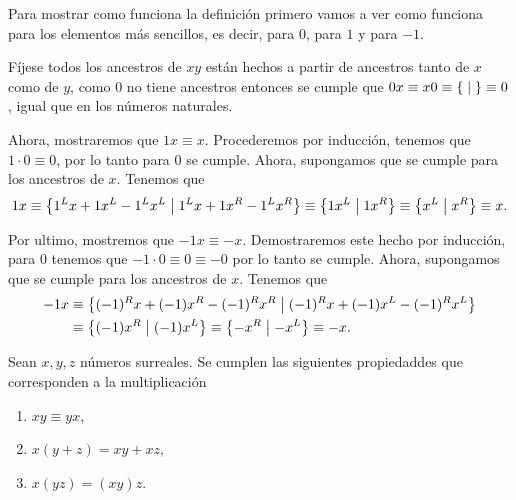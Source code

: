     \begin{example}
        Para mostrar como funciona la definici\'on primero vamos a ver como funciona para los elementos m\'as sencillos, es decir, para $0$, para $1$ y para $-1$.

        F\'ijese todos los ancestros de $xy$ est\'an hechos a partir de ancestros tanto de $x$ como de $y$, como $0$ no tiene ancestros entonces se cumple que $0x \equiv x0 \equiv \left\{\;\middle|\; \right\} \equiv 0$, igual que en los n\'umeros naturales.
        
        Ahora, mostraremos que $1x \equiv x$. Procederemos por inducci\'on, tenemos que $1\cdot 0 \equiv 0$, por lo tanto para $0$ se cumple. Ahora, supongamos que se cumple para los ancestros de $x$. Tenemos que 
        \[
            1x \equiv \left\{1^Lx + 1x^L - 1^Lx^L\;\middle|\; 1^Lx + 1x^R - 1^Lx^R\right\} \equiv \left\{1x^L\;\middle|\; 1x^R\right\} \equiv \left\{x^L\;\middle|\; x^R\right\} \equiv x.
        \]

        Por ultimo, mostremos que $-1x \equiv -x$. Demostraremos este hecho por inducci\'on, para $0$ tenemos que $-1\cdot 0\equiv 0 \equiv -0$ por lo tanto se cumple. Ahora, supongamos que se cumple para los ancestros de $x$. Tenemos que 
        \begin{align*}
            -1x & \equiv \left\{(-1)^Rx + (-1)x^R - (-1)^Rx^R\;\middle|\; (-1)^Rx + (-1)x^L - (-1)^Rx^L\right\} \\
             & \equiv \left\{(-1)x^R\;\middle|\; (-1)x^L\right\} \equiv \left\{-x^R\;\middle|\; -x^L\right\} \equiv -x.
        \end{align*}
    \end{example}

    \begin{theorem}
        Sean $x,y,z$ n\'umeros surreales. Se cumplen las siguientes propiedaddes que corresponden a la multiplicaci\'on
        \begin{enumerate}[nosep]
            \item $xy\equiv yx$,
            \item $x(y+z) = xy + xz$,
            \item $x(yz) = (xy)z$.
        \end{enumerate}
    \end{theorem}

